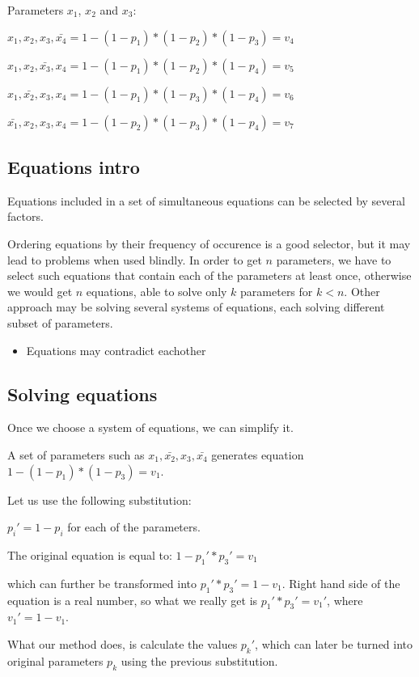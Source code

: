 \documentclass{article}
\begin{document}
Parameters $x_1$, $x_2$ and $x_3$:

$     x_1,       x_2,      x_3, \bar{x_4} = 1-(1-p_1)*(1-p_2)*(1-p_3) = v_4$

$     x_1,       x_2, \bar{x_3},     x_4  = 1-(1-p_1)*(1-p_2)*(1-p_4) = v_5$

$     x_1,  \bar{x_2},      x_3,     x_4  = 1-(1-p_1)*(1-p_3)*(1-p_4) = v_6$

$\bar{x_1},      x_2,       x_3,     x_4  = 1-(1-p_2)*(1-p_3)*(1-p_4) = v_7$

\subsection{Equations intro}


Equations included in a set of simultaneous equations can be selected by several factors. 

Ordering equations by their frequency of occurence is a good selector, but it may lead to problems when used blindly.
In order to get $n$ parameters, we have to select such equations that contain each of the parameters at least once, otherwise we would get $n$ equations, able to solve only $k$ parameters for $k < n$.
Other approach may be solving several systems of equations, each solving different subset of parameters.

\begin{itemize}
    \item Equations may contradict eachother
\end{itemize}

\subsection{Solving equations}

Once we choose a system of equations, we can simplify it.

A set of parameters such as $     x_1,       \bar{x_2},      x_3, \bar{x_4}$ generates equation $1-(1-p_1)*(1-p_3) = v_1$.

Let us use the following substitution:

$p_i' = 1 - p_i$ for each of the parameters.

The original equation is equal to:
$1-p_1'*p_3'=v_1$

which can further be transformed into
$p_1'*p_3' = 1 - v_1$.
Right hand side of the equation is a real number, so what we really get is
$p_1'*p_3' = v_1'$, where $v_1' = 1 - v_1$.

What our method does, is calculate the values $p_k'$, which can later be turned into original parameters $p_k$ using the previous substitution. 
\end{document}
